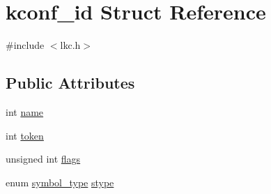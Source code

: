 \hypertarget{structkconf__id}{\section{kconf\-\_\-id Struct Reference}
\label{structkconf__id}
}


{\ttfamily \#include $<$lkc.\-h$>$}

\subsection*{Public Attributes}
\begin{DoxyCompactItemize}
\item 
int \hyperlink{structkconf__id_a1357a22bd80040da9b13c168460407b1}{name}
\item 
int \hyperlink{structkconf__id_a4576c55c736cbb6fdb1638d098a82c9f}{token}
\item 
unsigned int \hyperlink{structkconf__id_a404b8ac9cb0e343ca20a7cf4247528e8}{flags}
\item 
enum \hyperlink{expr_8h_a9e6705a3296471be728a3b6570b56231}{symbol\-\_\-type} \hyperlink{structkconf__id_ac37c179c1795cafc1d7b795010c9e80e}{stype}
\end{DoxyCompactItemize}


